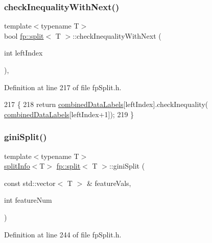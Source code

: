 \subsubsection{\texorpdfstring{check\+Inequality\+With\+Next()}{checkInequalityWithNext()}}
{\footnotesize\ttfamily template$<$typename T$>$ \\
bool \hyperlink{classfp_1_1split}{fp\+::split}$<$ T $>$\+::check\+Inequality\+With\+Next (\begin{DoxyParamCaption}\item[{int}]{left\+Index }\end{DoxyParamCaption})\hspace{0.3cm}{\ttfamily [inline]}, {\ttfamily [protected]}}



Definition at line 217 of file fp\+Split.\+h.


\begin{DoxyCode}
217                                                                   \{
218                     \textcolor{keywordflow}{return} \hyperlink{classfp_1_1split_ac8f54cf4a42335814e10e351c49e3c32}{combinedDataLabels}[leftIndex].checkInequality(
      \hyperlink{classfp_1_1split_ac8f54cf4a42335814e10e351c49e3c32}{combinedDataLabels}[leftIndex+1]);
219                 \}
\end{DoxyCode}
\mbox{\label{classfp_1_1split_a6a98f17c8b3fc3b8047e4559f8b618b7}} 
\subsubsection{\texorpdfstring{gini\+Split()}{giniSplit()}}
{\footnotesize\ttfamily template$<$typename T$>$ \\
\hyperlink{classfp_1_1splitInfo}{split\+Info}$<$T$>$ \hyperlink{classfp_1_1split}{fp\+::split}$<$ T $>$\+::gini\+Split (\begin{DoxyParamCaption}\item[{const std\+::vector$<$ T $>$ \&}]{feature\+Vals,  }\item[{int}]{feature\+Num }\end{DoxyParamCaption})\hspace{0.3cm}{\ttfamily [inline]}}



Definition at line 244 of file fp\+Split.\+h.


